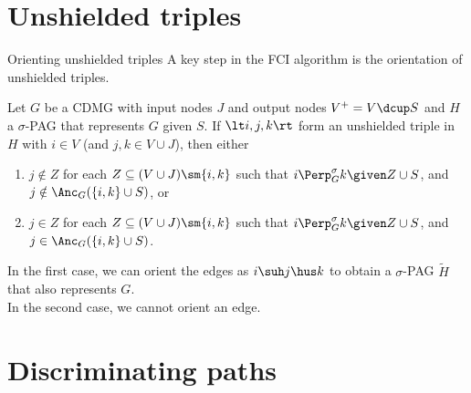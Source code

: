 \section{Unshielded triples}
\frame{\sectionpage}

\begin{frame}{Orienting unshielded triples}
A key step in the FCI algorithm is the orientation of unshielded triples.

\medskip
\begin{Prp}[\ref{prp:orienting_unshielded_triples}]
  Let $G$ be a CDMG with input nodes $J$ and output nodes $V^+ = V \dcup S$ and $H$ a $\sigma$-PAG that represents $G$ given $S$.
  If $\lt i, j, k \rt$ form an unshielded triple in $H$ with $i \in V$ (and $j,k \in V \cup J$), then either 
  \begin{enumerate}
    \item $j \notin Z$ for each $Z \subseteq (V \cup J) \sm \{i,k\}$ such that $i \Perp^\sigma_G k \given Z \cup S$, and $j \notin \Anc_G(\{i,k\} \cup S)$, or
    \item $j \in Z$ for each $Z \subseteq (V \cup J) \sm \{i,k\}$ such that $i \Perp^\sigma_G k \given Z \cup S$, and $j \in \Anc_G(\{i,k\} \cup S)$.
  \end{enumerate}
\end{Prp}

\medskip
  In the first case, we can orient the edges as $i \suh j \hus k$ to obtain a $\sigma$-PAG $\tilde{H}$ that also represents $G$. \\
  In the second case, we cannot orient an edge.
\end{frame}

\section{Discriminating paths}
\frame{\sectionpage}

